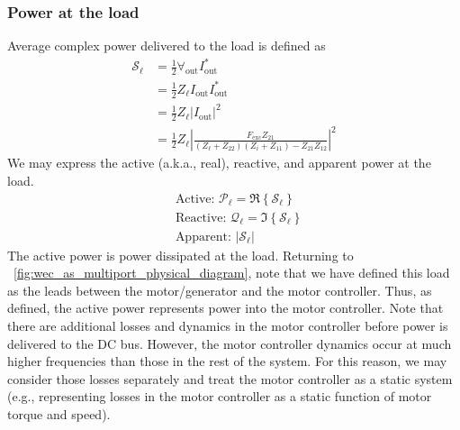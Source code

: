 \documentclass[lettersize,journal]{IEEEtran}
\begin{document}
\subsubsection{Power at the load}\label{sec:power_at_the_load}
Average complex power delivered to the load is defined as 
\begin{equation}
\begin{aligned}
        \mathcal{S}_{\ell} 
        &= \frac{1}{2} \forall_{\textrm{out}} I_{\textrm{out}}^* \\
        &= \frac{1}{2} Z_\ell I_{\textrm{out}} I_{\textrm{out}}^* \\
        &= \frac{1}{2} Z_\ell | I_{\textrm{out}} |^2 \\
        &= \frac{1}{2} Z_\ell \left| \frac{F_{\textrm{exc}} Z_{21}}{ (Z_\ell + Z_{22}) (Z_i + Z_{11}) - Z_{21} Z_{12}  } \right|^2 
\end{aligned}
\end{equation}
%
We may express the active (a.k.a., real), reactive, and apparent power at the load.
%
\begin{subequations}
\begin{align}
        &\textrm{Active: } \mathcal{P}_{\ell} = \Re \left\{ \mathcal{S}_{\ell} \right\} \\[0.5em]
        &\textrm{Reactive: } \mathcal{Q}_{\ell} = \Im \left\{ \mathcal{S}_{\ell} \right\} \\[0.5em]
        &\textrm{Apparent: } | \mathcal{S}_{\ell} |
\end{align}\label{eq:load_power_types}%
\end{subequations}
%
The active power is power dissipated at the load.
Returning to \figurename~\ref{fig:wec_as_multiport_physical_diagram}, note that we have defined this load as the leads between the motor/generator and the motor controller.
Thus, as defined, the active power represents power into the motor controller.
Note that there are additional losses and dynamics in the motor controller before power is delivered to the DC bus.
However, the motor controller dynamics occur at much higher frequencies than those in the rest of the system.
For this reason, we may consider those losses separately and treat the motor controller as a static system (e.g., representing losses in the motor controller as a static function of motor torque and speed).
\end{document}
